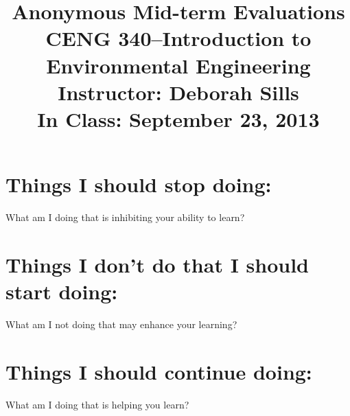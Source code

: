 \documentclass[11pt,letterpaper]{article}
\begin{document}
\setlength{\parindent}{0cm} 



\frenchspacing

\setlength{\textwidth}{6.25in}

\title {\Large{\textbf{Anonymous Mid-term Evaluations}}\\ \large{CENG 340--Introduction to Environmental Engineering\\
Instructor: Deborah Sills\\ \textbf{In Class: September 23, 2013}}}

\author {}
\date {}
\maketitle

\vspace{-1.5cm}\section *{Things I should \textbf{stop} doing:}
What am I doing that is inhibiting your ability to learn?

\vspace{2.5in}

\section *{Things I don't do that I should \textbf{start} doing:}
What am I not doing that may enhance your learning?
\vspace{2.5in}

\section *{Things I should \textbf{continue} doing:}
What am I doing that is helping you learn?
\end{document}
